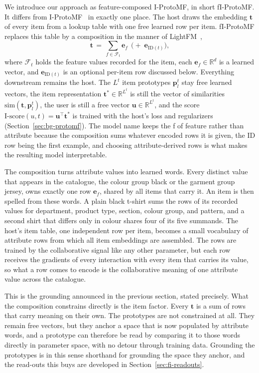 We introduce our approach as feature-composed I-ProtoMF, in short
fI-ProtoMF. It differs from I-ProtoMF~\cite{melchiorre2022protomf} in
exactly one place. The host draws the embedding $\mathbf{t}$ of every
item from a lookup table with one free learned row per item. fI-ProtoMF
replaces this table by a composition in the manner of
LightFM~\cite{kula2015lightfm},
\begin{equation}
\mathbf{t} \,=\, \sum_{f \in \mathcal{F}_t} \mathbf{e}_f
\;\,\bigl(+\; \mathbf{e}_{\mathrm{ID}(t)}\bigr),
\label{eq:fi-composition}
\end{equation}
where $\mathcal{F}_t$ holds the feature values recorded for the item,
each $\mathbf{e}_f \in \mathbb{R}^d$ is a learned vector, and
$\mathbf{e}_{\mathrm{ID}(t)}$ is an optional per-item row discussed
below. Everything downstream remains the host. The $L^t$ item prototypes
$\mathbf{p}^t_l$ stay free learned vectors, the item representation
$\mathbf{t}^* \in \mathbb{R}^{L^t}$ is still the vector of similarities
$\mathrm{sim}(\mathbf{t}, \mathbf{p}^t_l)$, the user is still a free
vector $\mathbf{u} \in \mathbb{R}^{L^t}$, and the score
$\text{I-score}(u,t) = \mathbf{u}^\top \mathbf{t}^*$ is trained with the
host's loss and regularizers (Section~\ref{sec:bg-protomf}). The model
name keeps the f of feature rather than attribute because the
composition sums whatever encoded rows it is given, the ID row being the
first example, and choosing attribute-derived rows is what makes the
resulting model interpretable.

The composition turns attribute values into learned words. Every
distinct value that appears in the catalogue, the colour group black or
the garment group jersey, owns exactly one row $\mathbf{e}_f$, shared by
all items that carry it. An item is then spelled from these words. A
plain black t-shirt sums the rows of its recorded values for department,
product type, section, colour group, and pattern, and a second shirt
that differs only in colour shares four of its five summands. The host's
item table, one independent row per item, becomes a small vocabulary of
attribute rows from which all item embeddings are assembled. The rows
are trained by the collaborative signal like any other parameter, but
each row receives the gradients of every interaction with every item
that carries its value, so what a row comes to encode is the
collaborative meaning of one attribute value across the catalogue.

This is the grounding announced in the previous section, stated
precisely. What the composition constrains directly is the item factor.
Every $\mathbf{t}$ is a sum of rows that carry meaning on their own. The
prototypes are not constrained at all. They remain free vectors, but
they anchor a space that is now populated by attribute words, and a
prototype can therefore be read by comparing it to those words directly
in parameter space, with no detour through training data. Grounding the
prototypes is in this sense shorthand for grounding the space they
anchor, and the read-outs this buys are developed in
Section~\ref{sec:fi-readouts}.

